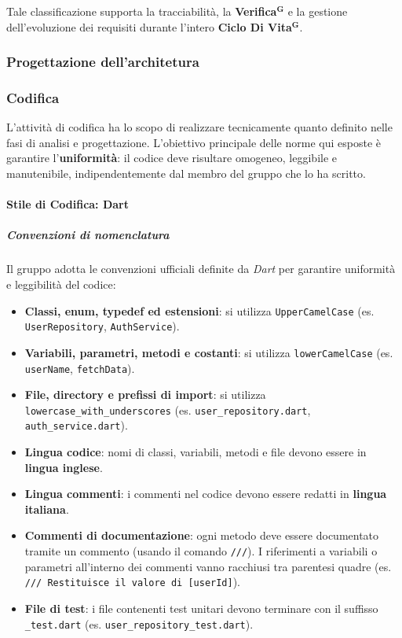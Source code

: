 \documentclass[a4paper,12pt]{article}
\newcommand{\term}[1]{\textbf{#1}$^\mathbf{G}$}
\begin{document}
Tale classificazione supporta la tracciabilità, la \term{Verifica} e la gestione dell’evoluzione dei requisiti durante l’intero \term{Ciclo Di Vita}.

\subsubsection{Progettazione dell'architetura} \label{subsubsec:progettazione-arc}


\subsubsection{Codifica}
L'attività di codifica ha lo scopo di realizzare tecnicamente quanto definito nelle fasi di analisi e progettazione.
L'obiettivo principale delle norme qui esposte è garantire l'\textbf{uniformità}: il codice deve risultare omogeneo, leggibile e manutenibile, indipendentemente dal membro del gruppo che lo ha scritto.

\paragraph{Stile di Codifica: Dart} \label{par:stile-cod-dart}

\subparagraph{Convenzioni di nomenclatura}
Il gruppo adotta le convenzioni ufficiali definite da \textit{Dart} per garantire uniformità e leggibilità del codice:
\begin{itemize}
    \item \textbf{Classi, enum, typedef ed estensioni}: si utilizza \texttt{UpperCamelCase} (es. \texttt{UserRepository}, \texttt{AuthService}).
    \item \textbf{Variabili, parametri, metodi e costanti}: si utilizza \texttt{lowerCamelCase} (es. \texttt{userName}, \texttt{fetchData}).
    \item \textbf{File, directory e prefissi di import}: si utilizza \texttt{lowercase\_with\_underscores} (es. \texttt{user\_repository.dart}, \texttt{auth\_service.dart}).
    \item \textbf{Lingua codice}: nomi di classi, variabili, metodi e file devono essere in \textbf{lingua inglese}.
    \item \textbf{Lingua commenti}: i commenti nel codice devono essere redatti in \textbf{lingua italiana}.
    \item \textbf{Commenti di documentazione}: ogni metodo deve essere documentato tramite un commento (usando il comando \texttt{///}).
    I riferimenti a variabili o parametri all'interno dei commenti vanno racchiusi tra parentesi quadre (es. \texttt{/// Restituisce il valore di [userId]}).
    \item \textbf{File di test}: i file contenenti test unitari devono terminare con il suffisso \texttt{\_test.dart} (es. \texttt{user\_repository\_test.dart}).
\end{itemize}
\end{document}
